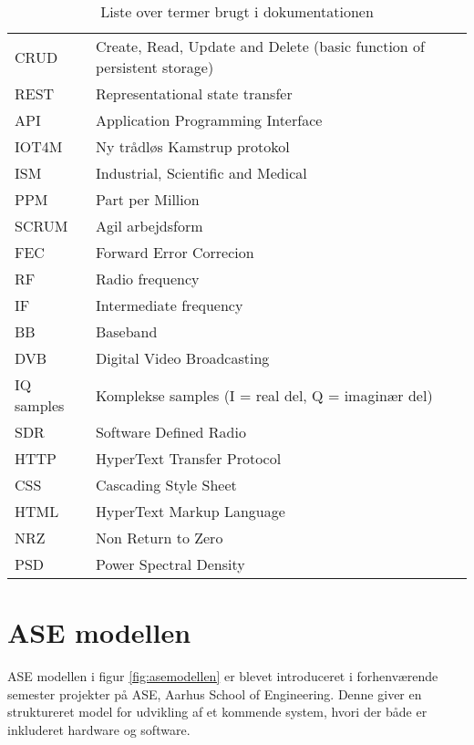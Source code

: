 \begin{appendices}
\begin{table}[H]
\begin{tabu}{  p{4cm}  p{9cm}   }
		CRUD & Create, Read, Update and Delete (basic function of persistent storage) \\

		REST & Representational state transfer \\

		API & Application Programming Interface \\

		IOT4M & Ny trådløs Kamstrup protokol \\

		ISM & Industrial, Scientific and Medical \\ 

		PPM & Part per Million \\ 

		SCRUM & Agil arbejdsform \\ 

		FEC & Forward Error Correcion \\

		RF & Radio frequency \\

		IF & Intermediate frequency \\

		BB & Baseband \\ 

		DVB & Digital Video Broadcasting \\

		IQ samples & Komplekse samples (I = real del, Q = imaginær del) \\

		SDR & Software Defined Radio \\ 

		HTTP & HyperText Transfer Protocol \\

		CSS & Cascading Style Sheet \\

		HTML & HyperText Markup Language \\

		NRZ & Non Return to Zero \\

		PSD & Power Spectral Density \\

	\end{tabu}
	\caption{Liste over termer brugt i dokumentationen}
	\label{tab:termliste_fortsat}
\end{table}

\pagebreak

\chapter{ASE modellen} \label{appendix::asemodellen}
ASE modellen i figur \ref{fig:asemodellen} er blevet introduceret i forhenværende semester projekter på ASE, Aarhus School of Engineering. Denne giver en struktureret model for udvikling af et kommende system, hvori der både er inkluderet hardware og software.


\end{appendices}
